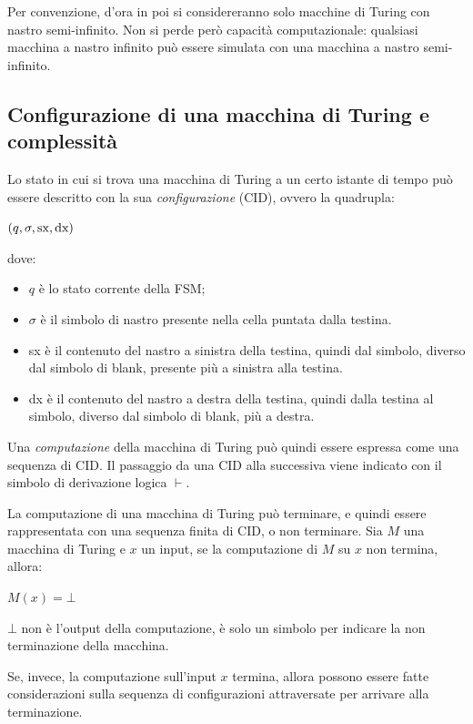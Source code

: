 Per convenzione, d'ora in poi si considereranno solo macchine di Turing con nastro semi-infinito. Non si perde però capacità computazionale: qualsiasi macchina a nastro infinito può essere simulata con una macchina a nastro semi-infinito.

\subsection*{Configurazione di una macchina di Turing e complessità}
Lo stato in cui si trova una macchina di Turing a un certo istante di tempo può
essere descritto con la sua \textit{configurazione} (CID), ovvero la quadrupla:
\begin{center}
    $(q, \sigma, \textnormal{sx}, \textnormal{dx})$
\end{center}
dove:
\begin{itemize}
    \item $q$ è lo stato corrente della FSM;
    \item $\sigma$ è il simbolo di nastro presente nella cella puntata dalla testina.
    \item sx è il contenuto del nastro a sinistra della testina, quindi dal simbolo, diverso dal simbolo di blank, presente più a sinistra alla testina.
    \item dx è il contenuto del nastro a destra della testina, quindi dalla testina al simbolo, diverso dal simbolo di blank, più a destra.
\end{itemize}

Una \textit{computazione} della macchina di Turing può quindi essere espressa come una sequenza di CID.
Il passaggio da una CID alla successiva viene indicato con il simbolo di derivazione logica $\vdash$.

La computazione di una macchina di Turing può terminare, e quindi essere rappresentata con una sequenza finita di CID, o non terminare.
Sia $M$ una macchina di Turing e $x$ un input, se la computazione di $M$ su $x$ non termina, allora:
\begin{center}
    $M(x) = \bot$
\end{center}
$\bot$ non è l'output della computazione, è solo un simbolo per indicare la non terminazione della macchina.

Se, invece, la computazione sull'input $x$ termina, allora possono essere fatte considerazioni sulla sequenza di configurazioni attraversate per arrivare alla terminazione.

